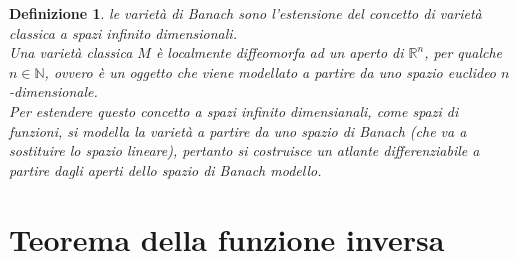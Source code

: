 \documentclass[twoside, 11pt]{amsbook}
\newcommand{\0}{{(0)}}
\newcommand{\3}{{(3)}}
\theoremstyle{colonplain}
\theoremstyle{colondefinition}
\newtheorem{defn}[thm]{Definizione}
\theoremstyle{colonremark}
\numberwithin{equation}{chapter}
\begin{document}
\begin{defn} le \textit{varietà di Banach} sono l'estensione del concetto di varietà classica a spazi infinito dimensionali. \\
Una varietà classica $M$ è localmente diffeomorfa ad un aperto di $\mathbb{R}^n$, per qualche $n \in \mathbb{N}$, ovvero è un oggetto che viene modellato a partire da uno spazio euclideo $n$-dimensionale. \\
Per estendere questo concetto a spazi infinito dimensianali, come spazi di funzioni, si modella la varietà a partire da uno spazio di Banach (che va a sostituire lo spazio lineare), pertanto si costruisce un atlante differenziabile a partire dagli aperti dello spazio di Banach modello.
\end{defn}

\chapter{Teorema della funzione inversa}
\end{document}
